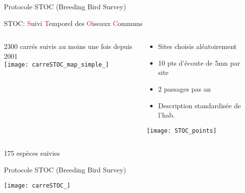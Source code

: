 \message{ !name(cours_DIE_ONIRIS_Suivi_populations_oiseaux.tex)}\documentclass[10pt]{beamer}
\begin{document}
\begin{frame}{Protocole STOC (Breeding Bird Survey)}
  \begin{center}
    STOC: \textcolor{red}{S}uivi \textcolor{red}{T}emporel des \textcolor{red}{O}iseaux \textcolor{red}{C}ommuns
  \end{center}
  \begin{columns}[c]
    \begin{column}[c]{0.5\textwidth}
      \begin{center}
        2300 carrés suivis au moins une fois depuis 2001 \\
        \texttt{[image: carreSTOC\_map\_simple\_]}
      \end{center}
    \end{column}
    \begin{column}[c]{0.5\textwidth}
      \begin{small}
        \begin{itemize}
        \item  Sites choisis aléatoirement
        \item 10 pts d'écoute de 5mn par site
        \item 2 passages pas an
        \item Description standardisée de l'hab.
        \end{itemize}
      \end{small}
      \begin{center}
        \texttt{[image: STOC\_points]}
      \end{center}
    \end{column}
  \end{columns}
  \begin{center}
    175 espèces suivies
  \end{center}
\end{frame}


\begin{frame}{Protocole STOC (Breeding Bird Survey)}
  \begin{center}
    \texttt{[image: carreSTOC\_]}
  \end{center}
\end{frame}
\end{document}
